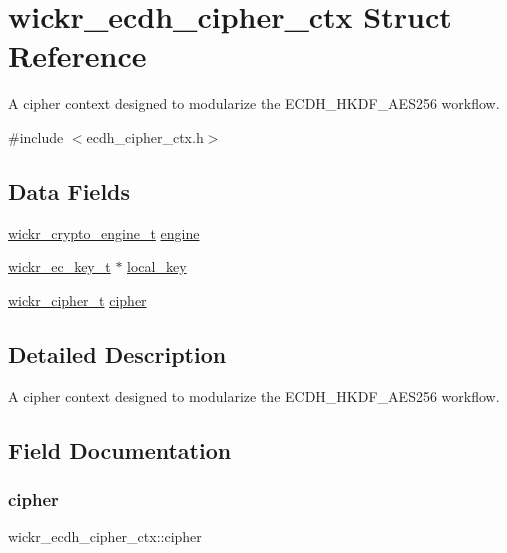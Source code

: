 \hypertarget{structwickr__ecdh__cipher__ctx}{}\section{wickr\+\_\+ecdh\+\_\+cipher\+\_\+ctx Struct Reference}
\label{structwickr__ecdh__cipher__ctx}


A cipher context designed to modularize the E\+C\+D\+H\+\_\+\+H\+K\+D\+F\+\_\+\+A\+E\+S256 workflow.  




{\ttfamily \#include $<$ecdh\+\_\+cipher\+\_\+ctx.\+h$>$}

\subsection*{Data Fields}
\begin{DoxyCompactItemize}
\item 
\mbox{\hyperlink{structwickr__crypto__engine}{wickr\+\_\+crypto\+\_\+engine\+\_\+t}} \mbox{\hyperlink{structwickr__ecdh__cipher__ctx_a4d953a0c8d6302db63f2fce624e6ffc2}{engine}}
\item 
\mbox{\hyperlink{structwickr__ec__key}{wickr\+\_\+ec\+\_\+key\+\_\+t}} $\ast$ \mbox{\hyperlink{structwickr__ecdh__cipher__ctx_ad9389a9efc31ac0516d9aebeb1ac6301}{local\+\_\+key}}
\item 
\mbox{\hyperlink{structwickr__cipher}{wickr\+\_\+cipher\+\_\+t}} \mbox{\hyperlink{structwickr__ecdh__cipher__ctx_a15e7d01b0e07501b572c11bde1c2e56e}{cipher}}
\end{DoxyCompactItemize}


\subsection{Detailed Description}
A cipher context designed to modularize the E\+C\+D\+H\+\_\+\+H\+K\+D\+F\+\_\+\+A\+E\+S256 workflow. 

\subsection{Field Documentation}
\mbox{\label{structwickr__ecdh__cipher__ctx_a15e7d01b0e07501b572c11bde1c2e56e}} 
\subsubsection{\texorpdfstring{cipher}{cipher}}
{\footnotesize\ttfamily wickr\+\_\+ecdh\+\_\+cipher\+\_\+ctx\+::cipher}

